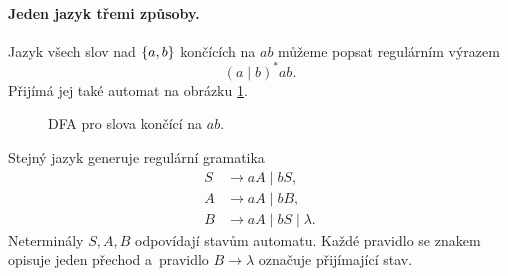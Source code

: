 \paragraph{Jeden jazyk třemi způsoby.}

Jazyk všech slov nad $\left\{a,b\right\}$ končících na $ab$ můžeme popsat regulárním výrazem
\[
    (a\mid b)^*ab.
\]
Přijímá jej také automat na obrázku \ref{fig:dfa-suffix-ab}.

\begin{figure}[h]
    \centering
    
    \caption{DFA pro slova končící na $ab$.}
    \label{fig:dfa-suffix-ab}
\end{figure}

Stejný jazyk generuje regulární gramatika
\[
\begin{aligned}
    S&\to aA\mid bS,\\
    A&\to aA\mid bB,\\
    B&\to aA\mid bS\mid\lambda.
\end{aligned}
\]
Neterminály $S,A,B$ odpovídají stavům automatu. Každé pravidlo se znakem opisuje jeden přechod a~pravidlo $B\to\lambda$ označuje přijímající stav.


